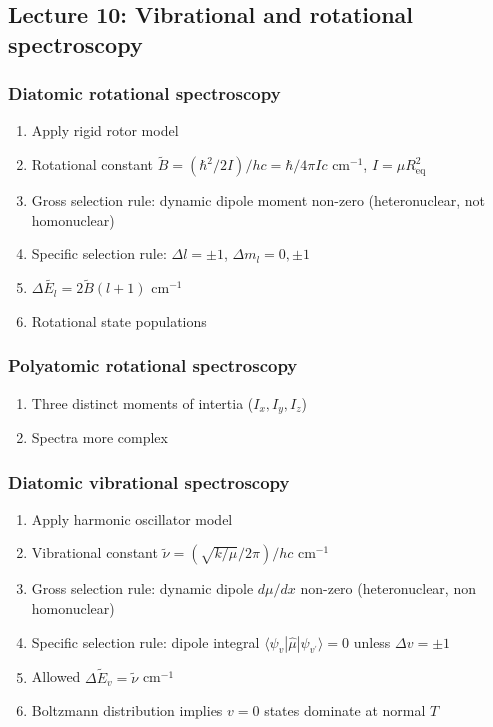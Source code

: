 \documentclass[11pt]{article}
\begin{document}
\subsection{Lecture 10: Vibrational and rotational spectroscopy}
\label{sec:org0ad7ba5}
\subsubsection{Diatomic rotational spectroscopy}
\label{sec:org1c44e66}
\begin{enumerate}
\item Apply rigid rotor model
\item Rotational constant \(\tilde{B} = (\hbar^2/2I)/hc = \hbar/4\pi I c\) cm\(^{-1}\), \(I=\mu R_\mathrm{eq}^2\)
\item Gross selection rule: dynamic dipole moment non-zero (heteronuclear, not homonuclear)
\item Specific selection rule: \(\Delta l=\pm 1\), \(\Delta m_l=0, \pm1\)
\item \(\Delta \tilde{E_l}  = 2\tilde{B}(l+1)\) cm\(^{-1}\)
\item Rotational state populations
\end{enumerate}
\subsubsection{Polyatomic rotational spectroscopy}
\label{sec:org27a112c}
\begin{enumerate}
\item Three distinct moments of intertia (\(I_x, I_y, I_z\))
\item Spectra more complex
\end{enumerate}
\subsubsection{Diatomic vibrational spectroscopy}
\label{sec:org6331a02}
\begin{enumerate}
\item Apply harmonic oscillator model
\item Vibrational constant \(\tilde{\nu} = (\sqrt{k/\mu}/2\pi)/hc\) cm\(^{-1}\)
\item Gross selection rule: dynamic dipole \(d\mu/dx\) non-zero (heteronuclear, non homonuclear)
\item Specific selection rule: dipole integral \(\langle \psi_v|\hat\mu|\psi_{v^\prime} \rangle =0\)
unless \(\Delta v = \pm 1\)
\item Allowed \(\Delta \tilde{E}_v = \tilde{\nu}\) cm\(^{-1}\)
\item Boltzmann distribution implies \(v=0\) states dominate at normal \(T\)
\end{enumerate}
\end{document}
